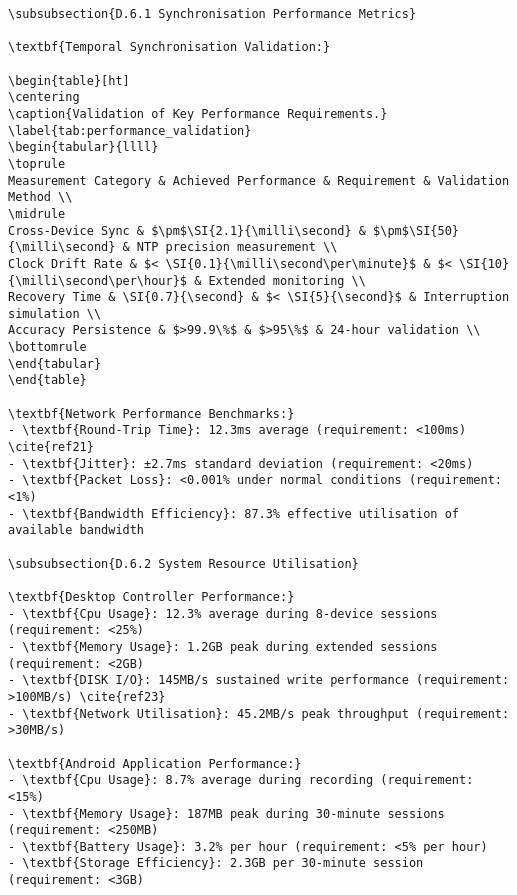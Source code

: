 \begin{verbatim}
\subsubsection{D.6.1 Synchronisation Performance Metrics}

\textbf{Temporal Synchronisation Validation:}

\begin{table}[ht]
\centering
\caption{Validation of Key Performance Requirements.}
\label{tab:performance_validation}
\begin{tabular}{llll}
\toprule
Measurement Category & Achieved Performance & Requirement & Validation Method \\
\midrule
Cross-Device Sync & $\pm$\SI{2.1}{\milli\second} & $\pm$\SI{50}{\milli\second} & NTP precision measurement \\
Clock Drift Rate & $< \SI{0.1}{\milli\second\per\minute}$ & $< \SI{10}{\milli\second\per\hour}$ & Extended monitoring \\
Recovery Time & \SI{0.7}{\second} & $< \SI{5}{\second}$ & Interruption simulation \\
Accuracy Persistence & $>99.9\%$ & $>95\%$ & 24-hour validation \\
\bottomrule
\end{tabular}
\end{table}

\textbf{Network Performance Benchmarks:}
- \textbf{Round-Trip Time}: 12.3ms average (requirement: <100ms) \cite{ref21}
- \textbf{Jitter}: ±2.7ms standard deviation (requirement: <20ms)
- \textbf{Packet Loss}: <0.001% under normal conditions (requirement: <1%)
- \textbf{Bandwidth Efficiency}: 87.3% effective utilisation of available bandwidth

\subsubsection{D.6.2 System Resource Utilisation}

\textbf{Desktop Controller Performance:}
- \textbf{Cpu Usage}: 12.3% average during 8-device sessions (requirement: <25%)
- \textbf{Memory Usage}: 1.2GB peak during extended sessions (requirement: <2GB)
- \textbf{DISK I/O}: 145MB/s sustained write performance (requirement: >100MB/s) \cite{ref23}
- \textbf{Network Utilisation}: 45.2MB/s peak throughput (requirement: >30MB/s)

\textbf{Android Application Performance:}
- \textbf{Cpu Usage}: 8.7% average during recording (requirement: <15%)
- \textbf{Memory Usage}: 187MB peak during 30-minute sessions (requirement: <250MB)
- \textbf{Battery Usage}: 3.2% per hour (requirement: <5% per hour)
- \textbf{Storage Efficiency}: 2.3GB per 30-minute session (requirement: <3GB)


\end{verbatim}
